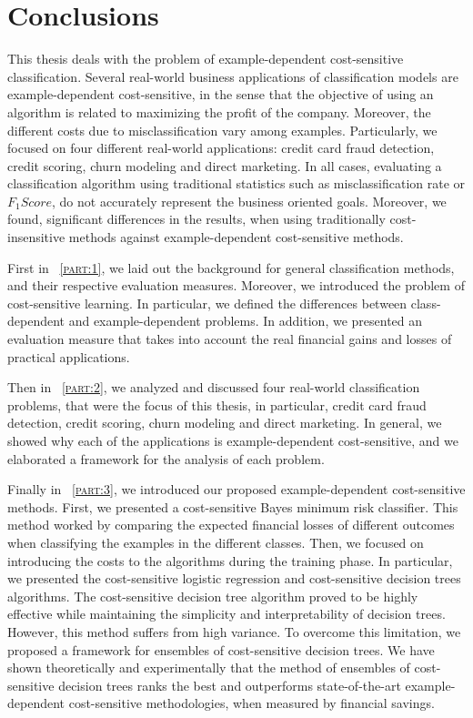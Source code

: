 \chapter{Conclusions}\label{ch:10}

This thesis deals with the problem of example-dependent cost-sensitive classification.
Several real-world business applications of classification models are example-dependent 
cost-sensitive, in the sense that the objective of using an algorithm is related to maximizing the 
profit of the company. Moreover, the different costs due to misclassification vary among examples. 
Particularly, we focused on four different real-world applications: credit card fraud 
detection, credit scoring, churn modeling and direct marketing. In all cases, evaluating a 
classification algorithm using traditional statistics such as misclassification rate or $F_1Score$, 
do not accurately represent the business oriented goals. Moreover, we found, significant 
differences in the results, when using traditionally cost-insensitive methods against 
example-dependent cost-sensitive methods.

First in \partname{~\textsc{\ref{part:1}}}, we laid out the background for general classification 
methods, and their respective evaluation measures. Moreover, we introduced the problem of 
cost-sensitive learning. In particular, we defined the differences between class-dependent and 
example-dependent problems. In addition, we presented an evaluation measure that takes into account 
the real financial gains and losses of practical applications.

Then in \partname{~\textsc{\ref{part:2}}}, we analyzed and discussed four real-world 
classification problems, that were the focus of this thesis, in particular, credit card fraud 
detection, credit scoring, churn modeling and direct marketing. In general, we showed why each of 
the applications is example-dependent cost-sensitive, and we elaborated a framework for the 
analysis of each problem. 

Finally in \partname{~\textsc{\ref{part:3}}}, we introduced our proposed example-dependent 
cost-sensitive methods. First, we presented a cost-sensitive Bayes minimum risk classifier. This 
method worked by comparing the expected financial losses of different outcomes when 
classifying the examples in the different classes. Then, we focused on introducing the costs to the 
algorithms during the training phase. In particular, we presented the cost-sensitive logistic 
regression and cost-sensitive decision trees algorithms. The cost-sensitive decision tree algorithm 
proved to be highly effective while maintaining the simplicity and interpretability of decision 
trees. However, this method suffers from high variance. To overcome this limitation, we proposed 
a framework for ensembles of cost-sensitive decision trees. We have shown theoretically and 
experimentally that the method of ensembles of cost-sensitive decision trees ranks the best and 
outperforms state-of-the-art example-dependent cost-sensitive methodologies, when measured by 
financial savings.

